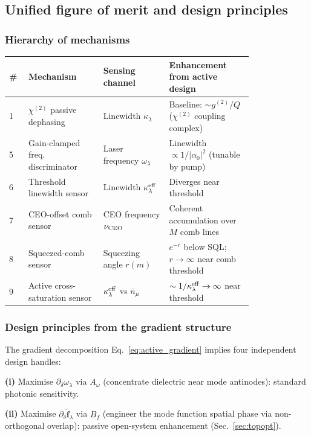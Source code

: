 \documentclass[12pt]{article}
\newcommand{\tf}{\tilde{\mathbf{f}}}
\begin{document}
\subsection{Unified figure of merit and design principles}

\subsubsection*{Hierarchy of mechanisms}

\begin{center}
\begin{tabular}{p{0.05\linewidth}p{0.25\linewidth}p{0.22\linewidth}p{0.28\linewidth}}
\toprule
\# & Mechanism & Sensing channel & Enhancement from active design\\
\midrule
1 & $\chi^{(2)}$ passive dephasing & Linewidth $\kappa_\lambda$ &
  Baseline: $\sim g^{(2)}/Q$ ($\chi^{(2)}$ coupling complex) \\
5 & Gain-clamped freq. discriminator & Laser frequency $\omega_\lambda$ &
  Linewidth $\propto 1/|\alpha_0|^2$ (tunable by pump) \\
6 & Threshold linewidth sensor & Linewidth $\kappa_\lambda^{\rm eff}$ &
  Diverges near threshold \\
7 & CEO-offset comb sensor & CEO frequency $\nu_{\rm CEO}$ &
  Coherent accumulation over $M$ comb lines \\
8 & Squeezed-comb sensor & Squeezing angle $r(m)$ &
  $e^{-r}$ below SQL; $r\to\infty$ near comb threshold \\
9 & Active cross-saturation sensor & $\kappa_\lambda^{\rm eff}$ vs $\bar{n}_\mu$ &
  $\sim 1/\kappa_\lambda^{\rm eff}\to\infty$ near threshold \\
\bottomrule
\end{tabular}
\end{center}

\subsubsection*{Design principles from the gradient structure}

The gradient decomposition Eq.~\eqref{eq:active_gradient} implies four
independent design handles:

\textbf{(i)} Maximise $\partial_\delta\omega_\lambda$ via $A_\omega$
(concentrate dielectric near mode antinodes):  standard photonic sensitivity.

\textbf{(ii)} Maximise $\partial_\delta\tf_\lambda$ via $B_f$ (engineer
the mode function spatial phase via non-orthogonal overlap):  passive
open-system enhancement (Sec.~\ref{sec:topopt}).
\end{document}
